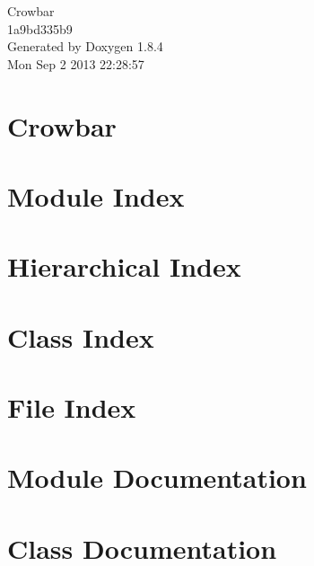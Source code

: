 \documentclass[twoside]{book}
\newcommand{\clearemptydoublepage}{%
  \newpage{\pagestyle{empty}\cleardoublepage}%
}
\begin{document}
\hypersetup{pageanchor=false}
\begin{titlepage}
\vspace*{7cm}
\begin{center}%
{\Large Crowbar \\[1ex]\large 1a9bd335b9 }\\
\vspace*{1cm}
{\large Generated by Doxygen 1.8.4}\\
\vspace*{0.5cm}
{\small Mon Sep 2 2013 22:28:57}\\
\end{center}
\end{titlepage}
\clearemptydoublepage
\tableofcontents
\clearemptydoublepage
{}
\hypersetup{pageanchor=true}

\chapter{Crowbar}
\label{md_README}
\hypertarget{md_README}{}

\chapter{Module Index}

\chapter{Hierarchical Index}

\chapter{Class Index}

\chapter{File Index}

\chapter{Module Documentation}

\chapter{Class Documentation}





















\end{document}
